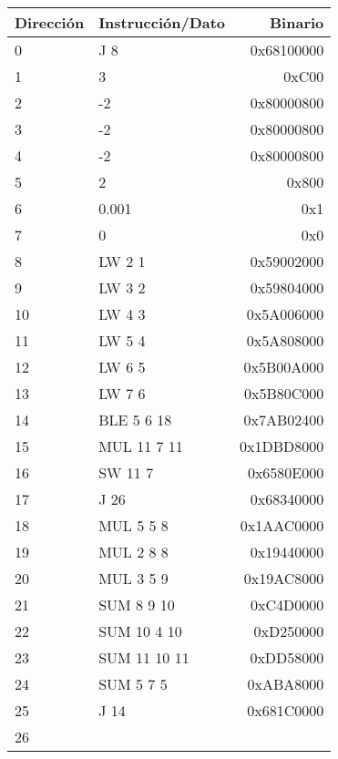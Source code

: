 \documentclass[12pt]{article}
\begin{document}
\begin{center}
  \begin{tabular}{ l  l  r }
    Dirección & Instrucción/Dato & Binario \\ \hline
    0 & J 8 & 0x68100000\\
    1 & 3 & 0xC00\\
    2 & -2 & 0x80000800\\
    3 & -2 & 0x80000800\\
    4 & -2 & 0x80000800\\
    5 & 2 & 0x800\\
    6 & 0.001 & 0x1\\
    7 & 0 & 0x0\\
    8 & LW 2 1 & 0x59002000\\
    9 & LW 3 2 & 0x59804000\\
    10 & LW 4 3 & 0x5A006000\\
    11 & LW 5 4 & 0x5A808000\\
    12 & LW 6 5 & 0x5B00A000\\
    13 & LW 7 6 & 0x5B80C000\\
    14 & BLE 5 6 18 & 0x7AB02400\\
    15 & MUL 11 7 11& 0x1DBD8000\\
    16 & SW 11 7 & 0x6580E000\\
    17 & J 26 & 0x68340000\\
    18 & MUL 5 5 8 & 0x1AAC0000\\
    19 & MUL 2 8 8 & 0x19440000\\
    20 & MUL 3 5 9 & 0x19AC8000\\
    21 & SUM 8 9 10 & 0xC4D0000\\
    22 & SUM 10 4 10 & 0xD250000\\
    23 & SUM 11 10 11 & 0xDD58000\\
    24 & SUM 5 7 5 & 0xABA8000\\
    25 & J 14 & 0x681C0000\\
    26 & & \\
  \end{tabular}
\end{center}
\end{document}
